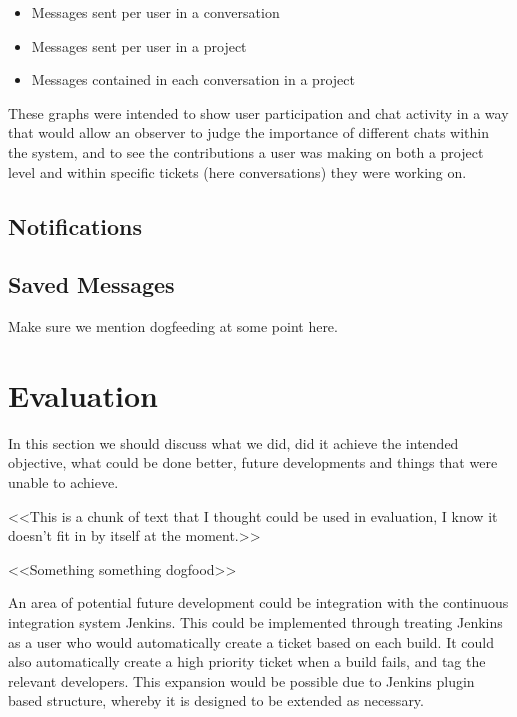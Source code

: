 \documentclass[a4paper]{l3proj}
\begin{document}
  \begin{itemize}
  \item Messages sent per user in a conversation
  \item Messages sent per user in a project
  \item Messages contained in each conversation in a project
  \end{itemize}

  These graphs were intended to show user participation and chat activity in a way that would allow an observer to judge the importance of different chats within the system, and to see the contributions a user was making on both a project level and within specific tickets (here conversations) they were working on.	

  \section{Notifications}
  \label{notifications}


  \section{Saved Messages}
  \label{savedMessages}

  Make sure we mention dogfeeding at some point here.

  \chapter{Evaluation}
  \label{evaluation}

  In this section we should discuss what we did, did it achieve the intended objective, what could be done better, 
  future developments and things that were unable to achieve.

  <<This is a chunk of text that I thought could be used in evaluation, I know it doesn't fit in by itself at the moment.>>

  <<Something something dogfood>>

  An area of potential future development could be integration with the continuous integration system Jenkins.  This could be implemented through treating Jenkins as a user who would automatically create a ticket based on each build.  It could also automatically create a high priority ticket when a build fails, and tag the relevant developers.  This expansion would be possible due to Jenkins plugin based structure, whereby it is designed to be extended as necessary.
\end{document}
